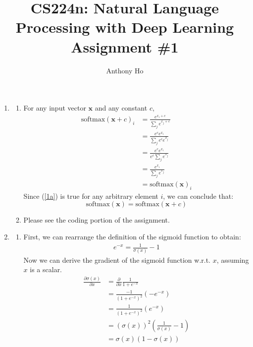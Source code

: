 \documentclass[10pt,reqno]{amsart}
\begin{document}
\title{CS224n: Natural Language Processing with Deep Learning\\Assignment \#1}
\author{Anthony Ho}
\maketitle


\newcommand{\f}{\frac}
\newcommand{\pd}[1]{\frac{\partial}{\partial #1}}
\newcommand{\pdd}[2]{\frac{\partial #1}{\partial #2}}
\newcommand{\softmax}{\text{softmax}}


\renewcommand{\labelenumi}{\arabic{enumi}.}
\begin{enumerate}[topsep=0pt,itemsep=2ex,partopsep=1ex,parsep=1ex]


\item
  \begin{enumerate}
  \item
    For any input vector $\bm{x}$ and any constant $c$,
    \begin{align}
      \softmax(\bm{x} + c)_i
      &= \f{e^{x_i + c}}{\sum_j e^{x_j + c}} \nonumber \\
      &= \f{e^c e^{x_i}}{\sum_j e^c e^{x_j}} \nonumber \\
      &= \f{e^c e^{x_i}}{e^c \sum_j e^{x_j}} \nonumber \\
      &= \f{e^{x_i}}{\sum_j e^{x_j}} \nonumber \\
      &= \softmax(\bm{x})_i \label{1a}
    \end{align}
    Since (\ref{1a}) is true for any arbitrary element $i$,
    we can conclude that:
    \begin{equation*}
      \softmax(\bm{x}) = \softmax(\bm{x} + c)
    \end{equation*}
    
  \item Please see the coding portion of the assignment.
  \end{enumerate}


\item
  \begin{enumerate}
  \item 
    First, we can rearrange the definition of the sigmoid function to obtain:
    \begin{align*}
      e^{-x} = \f{1}{\sigma(x)} - 1
    \end{align*}
    Now we can derive the gradient of the sigmoid function w.r.t. $x$,
    assuming $x$ is a scalar. 
    \begin{align*}
      \pdd{\sigma(x)}{x}
      &= \pd{x} \f{1}{1 + e^{-x}} \\
      &= \f{-1}{(1 + e^{-x})^2} \left( - e^{-x} \right) \\
      &= \f{1}{(1 + e^{-x})^2} \left( e^{-x} \right) \\
      &= \left( \sigma(x) \right)^2 \left( \f{1}{\sigma(x)} - 1 \right) \\
      &= \sigma(x) \left( 1 - \sigma(x) \right)
    \end{align*}


\end{enumerate}
\end{enumerate}
\end{document}
